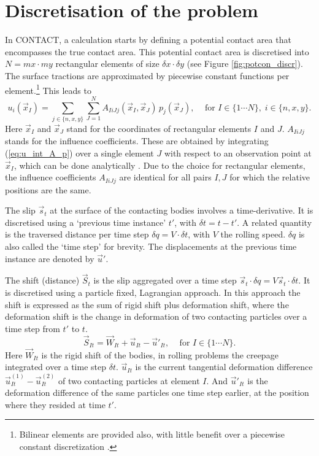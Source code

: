 \documentclass[12pt]{report}
\begin{document}
\section{Discretisation of the problem}

In CONTACT, a calculation starts by defining a potential contact area that
encompasses the true contact area. This potential contact area is
discretised into $N=mx\cdot my$ rectangular elements of size $\delta x
\cdot \delta y$ (see Figure \ref{fig:potcon_discr}). The surface tractions
are approximated by piecewise constant functions per
element.\footnote{Bilinear elements are provided also, with little benefit
over a piecewise constant discretization \cite{Vollebregt2009a-cm2009,
Wekken2019a-subsurf}.} This leads to
\begin{equation}\label{eq:ui_sum_Aij_pj}
    u_i(\vec{x}_I) = \sum_{j\in\{n,x,y\}}\sum_{J=1}^N
        A_{IiJj}(\vec{x}_I,\vec{x}_J) \, p_j(\vec{x}_J), \;\;\;
        \mbox{ for } I\in\{1\cdots N\}, \; i\in \{n,x,y\}.
\end{equation}
Here $\vec{x}_I$ and $\vec{x}_J$ stand for the coordinates of rectangular
elements $I$ and $J$. $A_{IiJj}$ stands for the influence coefficients. These
are obtained by integrating (\ref{eq:u_int_A_p}) over a single element $J$
with respect to an observation point at $\vec{x}_I$, which can be done
analytically \cite{Kalker1990}. Due to the choice for rectangular elements,
the influence coefficients $A_{IiJj}$ are identical for all pairs $I,J$ for
which the relative positions are the same.

The slip $\vec{s}_t$ at the surface of the contacting bodies involves
a time-derivative. It is discretised using a `previous time instance'
$t'$, with $\delta t=t-t'$. A related quantity is the traversed distance
per time step $\delta q = V\cdot \delta t$, with $V$ the rolling speed.
$\delta q$ is also called the `time step' for brevity.
The displacements at the previous time instance are denoted by $\vec{u}'$.

The shift (distance) $\vec{S}_t$ is the slip aggregated over a time
step $\vec{s}_t\cdot\delta q=V\vec{s}_t\cdot\delta t$. It is discretised using
a particle fixed, Lagrangian approach. In this approach the shift is
expressed as the sum of rigid shift plus deformation shift, where the
deformation shift is the change in deformation of two contacting particles
over a time step from $t'$ to $t$.
\begin{equation}\label{eq:discr_shift}
   \vec{S}_{It} = \vec{W}_{It} + \vec{u}_{It} - \vec{u}'_{It}, \;\;\;
        \mbox{ for } I\in\{1\cdots N\}.
\end{equation}
Here $\vec{W}_{It}$ is the rigid shift of the bodies, in rolling problems the
creepage integrated over a time step $\delta t$. $\vec{u}_{It}$ is the current
tangential deformation difference $\vec{u}^{(1)}_{It}-\vec{u}^{(2)}_{It}$ of
two contacting particles at element $I$. And $\vec{u}'_{It}$ is the
deformation difference of the same particles one time step earlier, at
the position where they resided at time $t'$.
\end{document}

